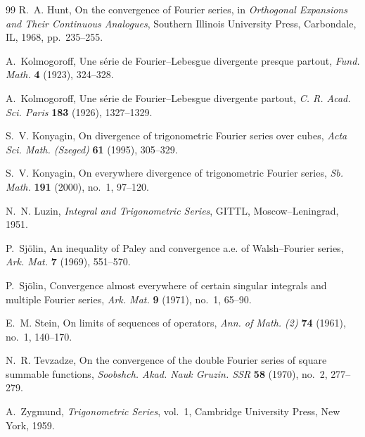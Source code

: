 \documentclass[11pt]{amsart}
\numberwithin{equation}{section}
\begin{document}
\begin{thebibliography}{99}
 R.~A. Hunt, On the convergence of Fourier series, in 
\emph{Orthogonal Expansions and Their Continuous Analogues}, Southern
Illinois University Press, Carbondale, IL, 1968, pp.~235--255.

 A.~Kolmogoroff, Une s\'erie de Fourier--Lebesgue
divergente presque partout, \emph{Fund. Math.} \textbf{4} (1923), 324--328.

 A.~Kolmogoroff, Une s\'erie de Fourier--Lebesgue
divergente partout, \emph{C. R. Acad. Sci. Paris} \textbf{183} (1926),
1327--1329.

 S.~V. Konyagin, On divergence of trigonometric
Fourier series over cubes, \emph{Acta Sci. Math. (Szeged)} \textbf{61}
(1995), 305--329.

 S.~V. Konyagin, On everywhere divergence of
trigonometric Fourier series, \emph{Sb. Math.} \textbf{191} (2000), no.~1,
97--120.

 N.~N. Luzin, \emph{Integral and Trigonometric Series},
GITTL, Moscow--Leningrad, 1951.

 P.~Sj\"olin, An inequality of Paley and convergence
a.e. of Walsh--Fourier series, \emph{Ark. Mat.} \textbf{7} (1969), 551--570.

 P.~Sj\"olin, Convergence almost everywhere of certain
singular integrals and multiple Fourier series, \emph{Ark. Mat.} \textbf{9}
(1971), no.~1, 65--90.

 E.~M. Stein, On limits of sequences of operators, \emph{%
Ann. of Math. (2)} \textbf{74} (1961), no.~1, 140--170.

 N.~R. Tevzadze, On the convergence of the double
Fourier series of square summable functions, \emph{Soobshch. Akad. Nauk
Gruzin. SSR} \textbf{58} (1970), no.~2, 277--279.

 A.~Zygmund, \emph{Trigonometric Series}, vol.~1,
Cambridge University Press, New York, 1959.
\end{thebibliography}
\end{document}
